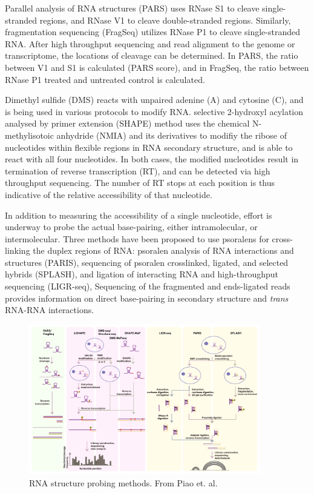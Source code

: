 \documentclass{proposal}
\begin{document}
﻿Parallel analysis of RNA structures (PARS)\cite{wan2014landscape}
﻿uses RNase S1 to cleave single-stranded regions, and RNase V1 to cleave double-stranded regions.
Similarly, ﻿fragmentation sequencing (FragSeq)\cite{underwood2010fragseq} utilizes ﻿RNase P1 to cleave single-stranded RNA.
After high throughput sequencing and read alignment to the genome or transcriptome,
the locations of cleavage can be determined.
In PARS, the ratio between V1 and S1 is calculated (PARS score),
and in FragSeq, the ratio between ﻿RNase P1 treated and untreated control is calculated.


﻿Dimethyl sulfide (DMS) reacts with ﻿unpaired adenine (A) and cytosine (C),
and is being used in various protocols to modify RNA\cite{rouskin2014genome, talkish2014mod}.
﻿selective 2-hydroxyl acylation analysed by primer extension (SHAPE)
method uses the chemical N-methylisotoic anhydride (NMIA) and its derivatives to
modifiy the ribose of nucleotides within flexible regions in RNA secondary structure,
and is able to react with all four nucleotides.
In both cases, the modified nucleotides result in ﻿termination of reverse transcription (RT),
and can be detected via high throughput sequencing.
The number of RT stops at each position is thus indicative of the relative accessibility of that nucleotide.

In addition to measuring the accessibility of a single nucleotide,
effort is underway to probe the actual base-pairing, either intramolecular, or intermolecular.
Three methods have been proposed to use psoralens for cross-linking the duplex regions of RNA:
psoralen analysis of RNA interactions and structures (PARIS)\cite{lu2018paris},
sequencing of psoralen crosslinked, ligated, and selected hybrids (SPLASH)\cite{aw2016vivo}, and
ligation of interacting RNA and high-throughput sequencing (LIGR-seq)\cite{sharma2016global},
Sequencing of the fragmented and ends-ligated reads provides information on direct base-pairing in secondary structure and \textit{trans} RNA-RNA interactions.


\begin{figure}[h!]
    \centering
    \includegraphics[width=0.9\textwidth]{probing_methods.png}
    \caption{RNA structure probing methods. From Piao et. al\cite{piao2017rna}.}
    \label{fig:probing_methods}
    \centering
\end{figure}
\end{document}

